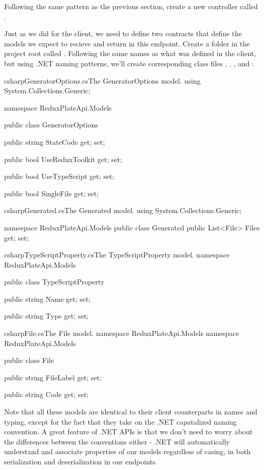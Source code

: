 \documentclass[paper=6in:9in,pagesize=pdftex,headinclude=on,footinclude=on,12pt,twoside]{scrbook}
\begin{document}
Following the same pattern as the previous section, create a new controller called .

Just as we did for the client, we need to define two contracts that define the models we expect to recieve and return in this endpoint. Create a folder in the project root called . Following the same names as what was defined in the client, but using .NET naming patterns, we'll create corresponding class files , , , and :

\begin{codeInput}{csharp}{GeneratorOptions.cs}{The GeneratorOptions model.}
using System.Collections.Generic;

namespace ReduxPlateApi.Models
{
    public class GeneratorOptions
    {
        public string StateCode { get; set; }

        public bool UseReduxToolkit { get; set; }

        public bool UseTypeScript { get; set; }

        public bool SingleFile { get; set; }
    }
}  
\end{codeInput}

\begin{codeInput}{csharp}{Generated.cs}{The Generated model.}
using System.Collections.Generic;

namespace ReduxPlateApi.Models
{
    public class Generated
    {
        public List<File> Files { get; set; }
    }
}  
\end{codeInput}

\begin{codeInput}{csharp}{TypeScriptProperty.cs}{The TypeScriptProperty model.}
namespace ReduxPlateApi.Models
{
    public class TypeScriptProperty
    {
        public string Name { get; set; }

        public string Type { get; set; }
    }
}  
\end{codeInput}

\begin{codeInput}{csharp}{File.cs}{The File model.}
namespace ReduxPlateApi.Models
namespace ReduxPlateApi.Models
{
    public class File
    {
        public string FileLabel { get; set; }

        public string Code { get; set; }
    }
}
\end{codeInput}

Note that all these models are identical to their client counterparts in names and typing, except for the fact that they take on the .NET capatalized naming convention. A great feature of .NET APIs is that we don't need to worry about the differences between the conventions either - .NET will automatically understand and associate properties of our models regardless of casing, in both serialization and deserialization in our endpoints.
\end{document}
